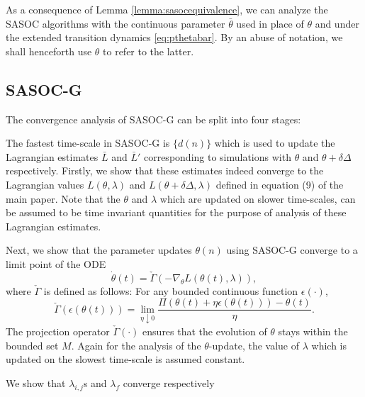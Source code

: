 \documentclass[11pt,letterpaper,english]{article}
\begin{document}
As a consequence of Lemma \ref{lemma:sasocequivalence}, we can analyze the SASOC algorithms with the continuous parameter $\bar\theta$ used in place of $\theta$ and under the extended transition dynamics \eqref{eq:pthetabar}. By an abuse of notation, we shall henceforth use $\theta$ to refer to the latter. 

\subsection*{SASOC-G}
 The convergence analysis of SASOC-G can be split into four stages:

\begin{inparaenum}[\bfseries (I)]
\hspace{-1em}\item The fastest time-scale in SASOC-G is $\{d(n)\}$ which is used to update the Lagrangian estimates $\bar{L}$ and $\bar{L}'$ corresponding to simulations with $\theta$ and $\theta + \delta \Delta$ respectively. Firstly, we show that these estimates indeed converge to the Lagrangian values $L(\theta, \lambda)$ and $L(\theta + \delta \Delta, \lambda)$ defined in equation (9) of the main paper. Note that the $\theta$ and $\lambda$ which are updated on slower time-scales, can be assumed to be time invariant quantities for the purpose of analysis of these Lagrangian estimates.\\
\item Next, we show that  the parameter updates $\theta(n)$ using SASOC-G converge to a limit point of the ODE
\begin{equation}
\label{eqn:sasoc-g:theta-ode}
\dot{\theta}(t) = \check{\Gamma}\left ( -\nabla_\theta L(\theta(t), \lambda) \right ),
\end{equation}
where $\check{\Gamma}$ is defined as follows: For any bounded continuous function $\epsilon(\cdot)$,
\begin{equation}
\label{eqn:Pi-bar-operator}
\check{\Gamma}(\epsilon(\theta(t))) = \lim\limits_{\eta \downarrow 0} \dfrac{\Pi(\theta(t) + \eta \epsilon(\theta(t))) - \theta(t)}{\eta}.
\end{equation}
The projection operator $\check{\Gamma}(\cdot)$ ensures that the evolution of $\theta$ stays within the bounded set $M$. Again for the analysis of the $\theta$-update, the value of $\lambda$ which is updated on the slowest time-scale is assumed constant.\\
\item We show that
$\lambda_{i, j}$s and $\lambda_f$ converge respectively

\end{inparaenum}
\end{document}
